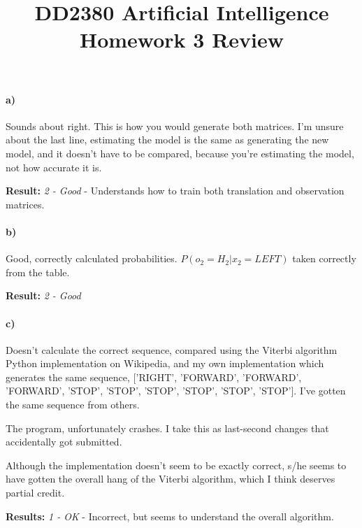 \documentclass[a4paper,11pt]{article}
\title{DD2380 Artificial Intelligence\\
        Homework 3 Review}
\begin{document}
\maketitle

\paragraph{a)}

Sounds about right. This is how you would generate both matrices. I'm unsure about the last line, estimating the model is the same as generating the new model, and it doesn't have to be compared, because you're estimating the model, not how accurate it is.

\textbf{Result:} \emph{2 - Good} - Understands how to train both translation and observation matrices.

\paragraph{b)}

Good, correctly calculated probabilities. $P(o_2 = H_2 | x_2 = LEFT)$ taken correctly from the table.

\textbf{Result:} \emph{2 - Good}

\paragraph{c)}
Doesn't calculate the correct sequence, compared using the Viterbi algorithm Python implementation on Wikipedia, and my own implementation which generates the same sequence, ['RIGHT', 'FORWARD', 'FORWARD', 'FORWARD', 'STOP', 'STOP', 'STOP', 'STOP', 'STOP', 'STOP']. I've gotten the same sequence from others.

The program, unfortunately crashes. I take this as last-second changes that accidentally got submitted.

Although the implementation doesn't seem to be exactly correct, s/he seems to have gotten the overall hang of the Viterbi algorithm, which I think deserves partial credit.

\textbf{Results:} \emph{1 - OK} - Incorrect, but seems to understand the overall algorithm.
\end{document}
